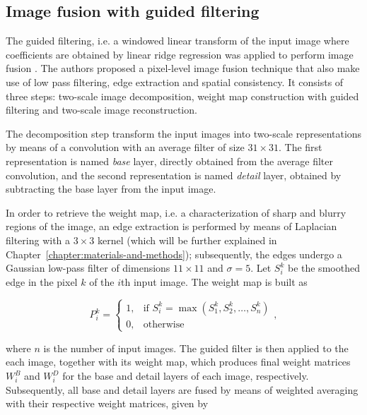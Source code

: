 \subsection{Image fusion with guided filtering}

The guided filtering, i.e. a windowed linear transform of the input image where coefficients are obtained by linear ridge regression was applied to perform image fusion \cite{li2013image}. The authors proposed a pixel-level image fusion technique that also make use of low pass filtering, edge extraction and spatial consistency. It consists of three steps: two-scale image decomposition, weight map construction with guided filtering and two-scale image reconstruction.

The decomposition step transform the input images into two-scale representations by means of a convolution with an average filter of size $31 \times 31$. The first representation is named \emph{base} layer, directly obtained from the average filter convolution, and the second representation is named \emph{detail} layer, obtained by subtracting the base layer from the input image.

In order to retrieve the weight map, i.e. a characterization of sharp and blurry regions of the image, an edge extraction is performed by means of Laplacian filtering with a $3 \times 3$ kernel (which will be further explained in Chapter~\ref{chapter:materials-and-methods}); subsequently, the edges undergo a Gaussian low-pass filter of dimensions $11 \times 11$ and $\sigma = 5$. Let $S_{i}^{k}$ be the smoothed edge in the pixel $k$ of the $i$th input image. The weight map is built as

\begin{equation}
\label{eqn:weight_map}
P_{i}^{k} = 
    \begin{cases}
        1, & \text{if } S_{i}^{k} = \max{(S_{1}^{k},S_{2}^{k},\dots,S_{n}^{k})}\\
        0, & \text{otherwise}
    \end{cases},
\end{equation}

\noindent where $n$ is the number of input images. The guided filter is then applied to the each image, together with its weight map, which produces final weight matrices $W_{i}^{B}$ and $W_{i}^{D}$ for the base and detail layers of each image, respectively. Subsequently, all base and detail layers are fused by means of weighted averaging with their respective weight matrices, given by

